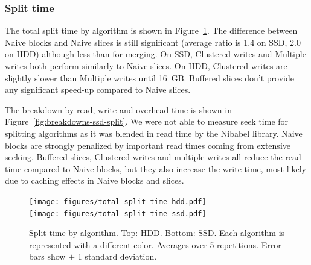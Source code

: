 \documentclass[10pt, conference, compsocconf]{IEEEtran}
\begin{document}
\subsubsection{Split time}

The total split time by algorithm is shown in
Figure~\ref{fig:split-time}. The difference between Naive blocks and
Naive slices is still significant (average ratio is 1.4 on SSD, 2.0 on
HDD) although less than for merging. On SSD, Clustered writes and
Multiple writes both perform similarly to Naive slices. On HDD,
Clustered writes are slightly slower than Multiple writes until
16~GB. Buffered slices don't provide any significant speed-up compared
to Naive slices.

The breakdown by read, write and overhead time is shown in
Figure~\ref{fig:breakdowns-ssd-split}. We were not able to measure
seek time for splitting algorithms as it was blended in read time by
the Nibabel library. Naive blocks are strongly penalized by important
read times coming from extensive seeking. Buffered slices, Clustered
writes and multiple writes all reduce the read time compared to Naive
blocks, but they also increase the write time, most likely due to
caching effects in Naive blocks and slices.

\begin{figure}[h]
  \centering
  \texttt{[image: figures/total-split-time-hdd.pdf]}\\
  \texttt{[image: figures/total-split-time-ssd.pdf]}
  \hfill
  \caption{Split time by algorithm. Top: HDD. Bottom: SSD. Each
    algorithm is represented with a different color. Averages over 5
    repetitions. Error bars show $\pm$ 1 standard deviation. }
\label{fig:split-time}
\end{figure}
\end{document}

